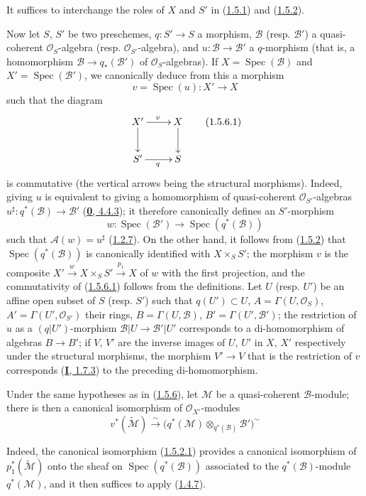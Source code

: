 It suffices to interchange the roles of $X$ and $S'$ in
(\hyperref[II.1.5.1]{1.5.1}) and
(\hyperref[II.1.5.2]{1.5.2}).

\begin{env}[1.5.6]
\label{II.1.5.6}
Now let $S$, $S'$ be two preschemes, $q:S'\to S$ a morphism,
$\mathcal{B}$ (resp. $\mathcal{B}'$) a quasi-coherent $\mathcal{O}_S$-algebra
(resp. $\mathcal{O}_{S'}$-algebra), and $u:\mathcal{B}\to\mathcal{B}'$
a $q$-morphism (that is, a homomorphism
$\mathcal{B}\to q_*(\mathcal{B}')$ of $\mathcal{O}_S$-algebras). If
$X=\operatorname{Spec}(\mathcal{B})$ and
$X'=\operatorname{Spec}(\mathcal{B}')$, we canonically deduce from this a
morphism
\[
  v=\operatorname{Spec}(u):X'\to X
\]
such that the diagram
\[
  \xymatrix{
    X'\ar[r]^v\ar[d] & X\ar[d]\\
    S'\ar[r]_q & S
  }
  \tag{1.5.6.1}\label{II.1.5.6.1}
\]
is commutative (the vertical arrows being the structural morphisms).
Indeed, giving $u$ is equivalent to giving a homomorphism of quasi-coherent
$\mathcal{O}_{S'}$-algebras
$u^\sharp:q^*(\mathcal{B})\to\mathcal{B}'$
(\hyperref[0.4.4.3]{\textbf{0}, 4.4.3}); it therefore canonically defines an
$S'$-morphism
\[
  w:\operatorname{Spec}(\mathcal{B}')\to
  \operatorname{Spec}(q^*(\mathcal{B}))
\]
such that $\mathcal{A}(w)=u^\sharp$
(\hyperref[II.1.2.7]{1.2.7}). On the other hand, it follows from
(\hyperref[II.1.5.2]{1.5.2}) that
$\operatorname{Spec}(q^*(\mathcal{B}))$ is canonically identified with
$X\times_S S'$; the morphism $v$ is the composite
$X'\xrightarrow{w}X\times_S S'\xrightarrow{p_1}X$ of $w$ with the first
projection, and the commutativity of
(\hyperref[II.1.5.6.1]{1.5.6.1}) follows from the definitions. Let $U$
(resp. $U'$) be an affine open subset of $S$ (resp. $S'$) such that
$q(U')\subset U$, $A=\Gamma(U,\mathcal{O}_S)$,
$A'=\Gamma(U',\mathcal{O}_{S'})$ their rings,
$B=\Gamma(U,\mathcal{B})$, $B'=\Gamma(U',\mathcal{B}')$; the restriction of
$u$ as a $(q|U')$-morphism
$\mathcal{B}|U\to\mathcal{B}'|U'$ corresponds to a di-homomorphism of
algebras $B\to B'$; if $V$, $V'$ are the inverse images of $U$, $U'$ in $X$,
$X'$ respectively under the structural morphisms, the morphism $V'\to V$
that is the restriction of $v$ corresponds (\hyperref[I.1.7.3]{\textbf{I}, 1.7.3})
to the preceding di-homomorphism.
\end{env}

\begin{env}[1.5.7]
\label{II.1.5.7}
Under the same hypotheses as in (\hyperref[II.1.5.6]{1.5.6}), let
$\mathcal{M}$ be a quasi-coherent $\mathcal{B}$-module; there is then a
canonical isomorphism of $\mathcal{O}_{X'}$-modules
\[
  v^*(\widetilde{\mathcal{M}})\xrightarrow{\sim}
  \bigl(q^*(\mathcal{M})\otimes_{q^*(\mathcal{B})}\mathcal{B}'\bigr)^{\sim}
  \tag{1.5.7.1}\label{II.1.5.7.1}
\]

Indeed, the canonical isomorphism
(\hyperref[II.1.5.2.1]{1.5.2.1}) provides a canonical isomorphism of
$p_1^*(\widetilde{\mathcal{M}})$ onto the sheaf on
$\operatorname{Spec}(q^*(\mathcal{B}))$ associated to the
$q^*(\mathcal{B})$-module $q^*(\mathcal{M})$, and it then suffices to apply
(\hyperref[II.1.4.7]{1.4.7}).
\end{env}

